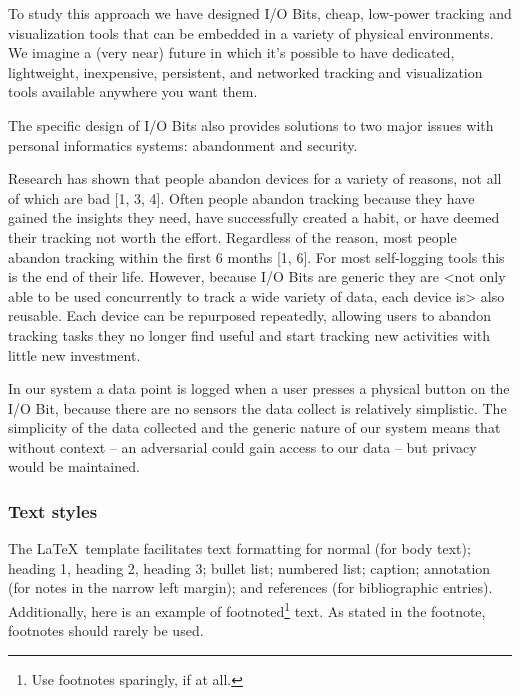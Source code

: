 \documentclass[sigchi-a, authorversion]{acmart}
\begin{document}
To study this approach we have designed I/O Bits, cheap, low-power tracking and visualization tools that can be embedded in a variety of physical environments.  We imagine a (very near) future in which it’s possible to have dedicated, lightweight, inexpensive, persistent, and networked tracking and visualization tools available anywhere you want them.

The specific design of I/O Bits also provides solutions to two major issues with personal informatics systems: abandonment and security. 

Research has shown that people abandon devices for a variety of reasons, not all of which are bad [1, 3, 4]. Often people abandon tracking because they have gained the insights they need, have successfully created a habit, or have deemed their tracking not worth the effort. Regardless of the reason, most people abandon tracking within the first 6 months [1, 6]. For most self-logging tools this is the end of their life. However, because I/O Bits are generic they are <not only able to be used concurrently to track a wide variety of data, each device is> also reusable. Each device can be repurposed repeatedly, allowing users to abandon tracking tasks they no longer find useful and start tracking new activities with little new investment.

In our system a data point is logged when a user presses a physical button on the I/O Bit, because there are no sensors the data collect is relatively simplistic. The simplicity of the data collected and the generic nature of our system means that without context – an adversarial could gain access to our data – but privacy would be maintained.


\subsubsection{Text styles}
The \LaTeX\ template facilitates text formatting for normal (for body
text); heading 1, heading 2, heading 3; bullet list; numbered list;
caption; annotation (for notes in the narrow left margin); and
references (for bibliographic entries). Additionally, here is an
example of footnoted\footnote{Use footnotes sparingly, if at all.}
text. As stated in the footnote, footnotes should rarely be used.
\end{document}
